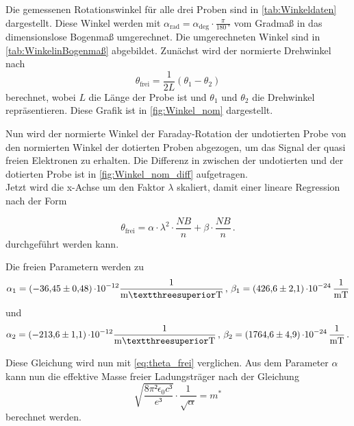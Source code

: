 Die gemessenen Rotationswinkel für alle drei Proben sind in \autoref{tab:Winkeldaten} dargestellt.
Diese Winkel werden mit $\alpha_{\text{rad}} = \alpha_{\text{deg}} \cdot \frac{\pi}{\SI{180}{\degree}}$ vom Gradmaß in das dimensionslose Bogenmaß umgerechnet.
Die umgerechneten Winkel sind in \autoref{tab:WinkelinBogenmaß} abgebildet.
Zunächst wird der normierte Drehwinkel nach  
\begin{equation*}
    \theta_{\text{frei}} = \frac{1}{2 L}\left(\theta_1 - \theta_2\right) 
\end{equation*}
berechnet, wobei $L$ die Länge der Probe ist und $\theta_1$ und $\theta_2$ die Drehwinkel repräsentieren.
Diese Grafik ist in \autoref{fig:Winkel_nom} dargestellt. 

Nun wird der normierte Winkel der Faraday-Rotation der undotierten Probe von den normierten Winkel der dotierten Proben abgezogen, um  das Signal der quasi freien Elektronen zu erhalten.
Die Differenz in zwischen der undotierten und der dotierten Probe ist in \autoref{fig:Winkel_nom_diff} aufgetragen.\\

Jetzt wird die x-Achse um den Faktor $\lambda$ skaliert, damit einer lineare Regression nach der Form 

\begin{equation*}
    \theta_{\text{frei}} = \alpha \cdot \lambda^2 \cdot \frac{N B}{n} + \beta \cdot \frac{N B}{n}\, .
\end{equation*}
durchgeführt werden kann.

Die freien Parametern werden zu %
\begin{equation*}
    \alpha_1 = \SI{-36.45 \pm 0.48}\cdot 10^{-12} \unit{\frac{1}{\meter³\tesla}} \,, \, \beta_1 = \SI{426.6 \pm 2.1}\cdot 10^{-24} \, \unit{\frac{1}{\meter\tesla}} \\ 
\end{equation*}
und
\begin{equation*}
    \alpha_2 = \SI{-213.6 \pm 1.1}\cdot 10^{-12} \unit{\frac{1}{\meter³\tesla}} \,, \,  \beta_2 = \SI{1764.6  \pm 4.9}\cdot 10^{-24} \, \unit{\frac{1}{\meter\tesla}}\, .  \\
\end{equation*}

Diese Gleichung wird nun mit \eqref{eq:theta_frei} verglichen.
Aus dem Parameter $\alpha$ kann nun die effektive Masse freier Ladungsträger nach der Gleichung
\begin{equation*}
    \sqrt{\frac{8 \pi² \epsilon_0 c³}{e³}} \cdot \frac{1}{\sqrt{\alpha}} = m^*
\end{equation*} 
berechnet werden.

